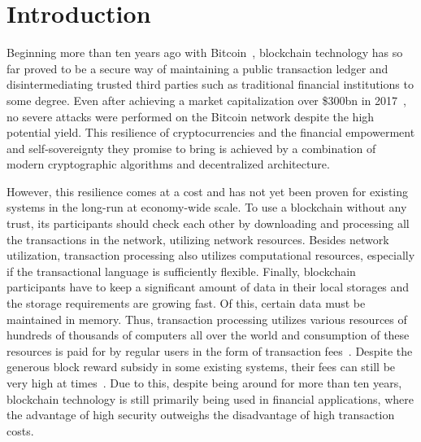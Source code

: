 \section{Introduction}
\label{sec:intro}


Beginning more than ten years ago with Bitcoin~\cite{nakamoto2008bitcoin}, blockchain technology has so far proved
to be a secure way of maintaining a public transaction ledger and disintermediating trusted third parties such as 
traditional financial institutions to some degree.
Even after achieving a market capitalization over \$300bn in 2017~\cite{btcPrice},
no severe attacks were performed on the Bitcoin network despite the high potential yield.
This resilience of cryptocurrencies and the financial empowerment and self-sovereignty they promise to bring is
achieved by a combination of modern cryptographic algorithms and decentralized architecture.

However, this resilience comes at a cost 
and has not yet been proven for existing systems in the long-run at economy-wide scale.
To use a blockchain without any trust, its participants should check each other by downloading and
processing all the transactions in the network, utilizing network resources.
Besides network utilization, transaction processing also utilizes computational resources,
especially if the transactional language is sufficiently flexible.
Finally, blockchain participants have to keep a significant amount of data in their local storages and
the storage requirements are growing fast.
Of this, certain data must be maintained in memory.
Thus, transaction processing utilizes various resources of hundreds of thousands of computers all over the world
and consumption of these resources is paid for by regular users in the form of transaction fees~\cite{chepurnoy2018systematic}.
Despite the generous block reward subsidy in some existing systems, their fees can still be very high at times~\cite{bitcoinFees}.
Due to this, despite being around for more than ten years, blockchain technology is still primarily being used in financial applications, where the advantage of high security outweighs the disadvantage of high transaction costs.

